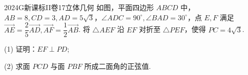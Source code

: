 
\begin{problem}{2024}{G}{新课标II卷}{17}{立体几何}
如图，平面四边形 $ABCD$ 中，$AB=8, CD=3, AD=5\sqrt{3}$，$\angle ADC=90^\circ, \angle BAD=30^\circ$，点 $E,F$ 满足 $\overrightarrow{AE}=\dfrac{2}{5}\overrightarrow{AD}, \overrightarrow{AF}=\dfrac{1}{2}\overrightarrow{AB}$. 将 $\triangle AEF$ 沿 $EF$ 对折至 $\triangle PEF$，使得 $PC=4\sqrt{3}$.

(1) 证明：$EF\perp PD$;

(2) 求面 $PCD$ 与面 $PBF$ 所成二面角的正弦值.
\end{problem}